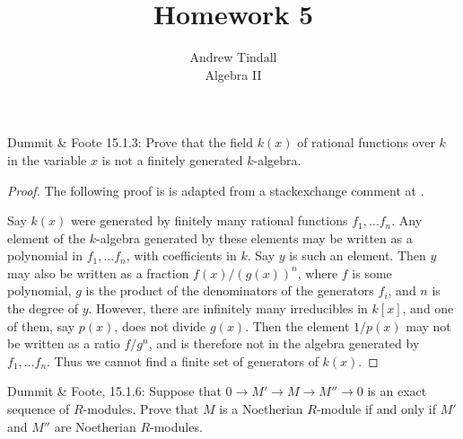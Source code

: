\documentclass[12pt]{article}
\theoremstyle{definition}
\newenvironment{problem}[2][Problem]{\begin{trivlist}
\item[\hskip \labelsep {\bfseries #1}\hskip \labelsep {\bfseries #2.}]}{\end{trivlist}}
\begin{document}
 
 
\title{Homework 5}
\author{Andrew Tindall\\ Algebra II}
 
\maketitle
\begin{problem}{1}
	Dummit \& Foote 15.1.3: Prove that the field $k(x)$ of rational functions over $k$ in the variable $x$ is not a finitely generated $k$-algebra.
\end{problem}
\begin{proof}
	The following proof is is adapted from a stackexchange comment at \cite{se}.
	\par Say $k(x)$ were generated by finitely many rational functions $f_1, \dots f_n$. Any element of the $k$-algebra generated by these elements may be written as a polynomial in $f_1, \dots f_n$, with coefficients in $k$. Say $y$ is such an element. Then $y$ may also be written as a fraction $f(x)/(g(x))^n$, where $f$ is some polynomial, $g$ is the product of the denominators of the generators $f_i$, and $n$ is the degree of $y$. However, there are infinitely many irreducibles in $k[x]$, and one of them, say $p(x)$, does not divide $g(x)$. Then the element $1/p(x)$ may not be written as a ratio $f/g^n$, and is therefore not in the algebra generated by $f_1, \dots f_n$. Thus we cannot find a finite set of generators of $k(x)$.
\end{proof}
\begin{problem}{2}
	Dummit \& Foote, 15.1.6: Suppose that $0 \to M' \to M \to M'' \to 0$ is an exact sequence of $R$-modules. Prove that $M$ is a Noetherian $R$-module if and only if $M'$ and $M''$ are Noetherian $R$-modules.
\end{problem}
\end{document}

